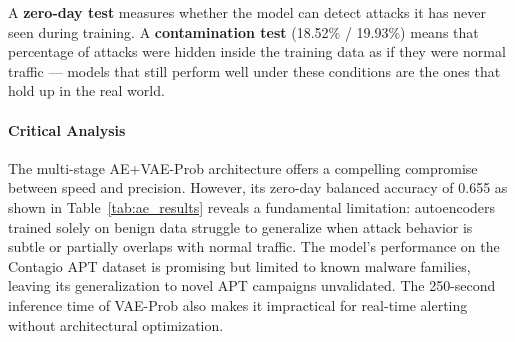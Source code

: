 \begin{table}[H]
\centering
\caption{Results for Independent Test (18.52\% Contamination) and Zero-Day Attack Test (19.93\% Contamination) }
\label{tab:ae_results}
\end{table}

A \textbf{zero-day test} measures whether the model can detect attacks it has never seen during training. A \textbf{contamination test} (18.52\% / 19.93\%) means that percentage of attacks were hidden inside the training data as if they were normal traffic --- models that still perform well under these conditions are the ones that hold up in the real world.

\paragraph{Critical Analysis}
The multi-stage AE+VAE-Prob architecture offers a compelling compromise between speed and precision. However, its zero-day balanced accuracy of 0.655 as shown in Table~\ref{tab:ae_results} reveals a fundamental limitation: autoencoders trained solely on benign data struggle to generalize when attack behavior is subtle or partially overlaps with normal traffic. The model's performance on the Contagio APT dataset is promising but limited to known malware families, leaving its generalization to novel APT campaigns unvalidated. The 250-second inference time of VAE-Prob also makes it impractical for real-time alerting without architectural optimization.

